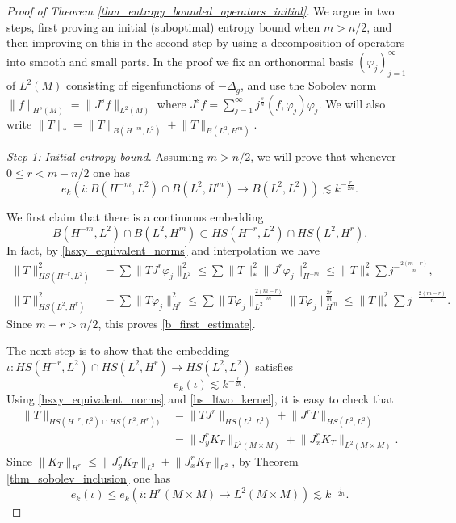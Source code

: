 \documentclass[12pt,twoside]{amsart}
\numberwithin{equation}{section}
\renewcommand{\leq}{\leqslant}
\newcommand{\norm}[1]{\lVert #1 \rVert}         %
\begin{document}
\begin{proof}[Proof of Theorem \ref{thm_entropy_bounded_operators_initial}]
We argue in two steps, first proving an initial (suboptimal) entropy bound when $m > n/2$, and then improving on this in the second step by using a decomposition of operators into smooth and small parts. In the proof we fix an orthonormal basis $(\varphi_j)_{j=1}^{\infty}$ of $L^2(M)$ consisting of eigenfunctions of $-\Delta_g$, and use the Sobolev norm $\norm{f}_{H^s(M)} = \norm{J^s f}_{L^2(M)}$ where $J^s f = \sum_{j=1}^{\infty} j^{\frac{s}{n}} (f, \varphi_j) \varphi_j$. We will also write $\norm{T}_* = \norm{T}_{B(H^{-m},L^2)} + \norm{T}_{B(L^2, H^m)}$.

\emph{Step 1: Initial entropy bound.}
Assuming $m > n/2$, we will prove that whenever $0 \leq r < m-n/2$ one has 
\begin{equation} \label{ek_initial_mntwo}
e_k(i: B(H^{-m}, L^2) \cap B(L^2, H^m) \to B(L^2, L^2)) \lesssim k^{-\frac{r}{2n}}.
\end{equation}

We first claim that there is a continuous embedding 
\begin{equation} \label{b_first_estimate}
B(H^{-m}, L^2) \cap B(L^2, H^m) \subset HS(H^{-r}, L^2) \cap HS(L^2, H^r).
\end{equation}
In fact, by \eqref{hsxy_equivalent_norms} and interpolation we have 
\begin{align*}
\norm{T}_{HS(H^{-r}, L^2)}^2 &= \sum \norm{T J^r \varphi_j}_{L^2}^2 \leq \sum \norm{T}_*^2 \norm{J^r \varphi_j}_{H^{-m}}^2 \leq \norm{T}_{*}^2 \sum j^{-\frac{2(m-r)}{n}}, \\
\norm{T}_{HS(L^2, H^r)}^2 &= \sum \norm{T \varphi_j}_{H^r}^2 \leq \sum \norm{T \varphi_j}_{L^2}^{\frac{2(m-r)}{m}} \norm{T \varphi_j}_{H^m}^{\frac{2r}{m}} \leq \norm{T}_{*}^2 \sum j^{-\frac{2(m-r)}{n}}.
\end{align*}
Since $m-r > n/2$, this proves \eqref{b_first_estimate}.

The next step is to show that the embedding $\iota: HS(H^{-r}, L^2) \cap HS(L^2, H^r) \rightarrow HS(L^2, L^2)$ satisfies 
\[
e_k(\iota)    \lesssim k^{-\frac{r}{2n} }  .
\]
Using \eqref{hsxy_equivalent_norms} and \eqref{hs_ltwo_kernel}, it is easy to check that
\begin{align*}
\norm{T}_{HS(H^{-r}, L^2) \cap HS(L^2, H^r))}
& =  \norm{ TJ^r }_{HS(L^2, L^2)} + \norm{J^{r} T }_{HS(L^2, L^2)} \\
&  = \norm{  J_y^r K_T }_{L^2(M \times M)} + \norm{J_x^{r}  K_T}_{L^2(M \times M)}.
\end{align*}
Since $\norm{K_T}_{H^{r}} \leq \norm{ J_y^{r} K_T}_{L^2}+\norm{ J_x^{r} K_T}_{L^2} $, by Theorem \ref{thm_sobolev_inclusion}
one has 
\[
e_k(\iota) \leq e_k(i: H^{r}(M \times M) \to L^2(M \times M)) \lesssim k^{-\frac{r}{2n}}.
\]


\end{proof}
\end{document}
